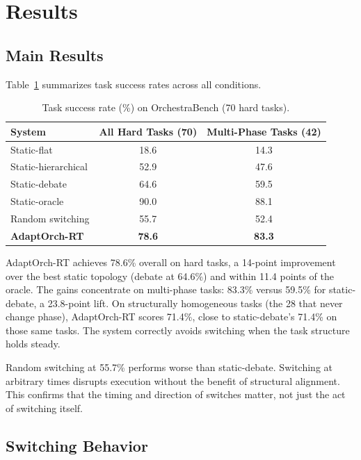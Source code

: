 \section{Results}\label{sec:results}

\subsection{Main Results}\label{main-results}

Table~\ref{tab:main_results} summarizes task success
rates across all conditions.

\begin{table}[h]
\centering
\caption{Task success rate (\%) on OrchestraBench (70 hard tasks).}
\label{tab:main_results}
\begin{tabular}{lcc}
\toprule
\textbf{System} & \textbf{All Hard Tasks (70)} & \textbf{Multi-Phase Tasks (42)} \\
\midrule
Static-flat & 18.6 & 14.3 \\
Static-hierarchical & 52.9 & 47.6 \\
Static-debate & 64.6 & 59.5 \\
Static-oracle & 90.0 & 88.1 \\
Random switching & 55.7 & 52.4 \\
\textbf{AdaptOrch-RT} & \textbf{78.6} & \textbf{83.3} \\
\bottomrule
\end{tabular}
\end{table}

AdaptOrch-RT achieves 78.6\% overall on hard tasks, a 14-point
improvement over the best static topology (debate at 64.6\%) and within
11.4 points of the oracle. The gains concentrate on multi-phase tasks:
83.3\% versus 59.5\% for static-debate, a 23.8-point lift. On
structurally homogeneous tasks (the 28 that never change phase),
AdaptOrch-RT scores 71.4\%, close to static-debate's 71.4\% on those
same tasks. The system correctly avoids switching when the task
structure holds steady.

Random switching at 55.7\% performs worse than static-debate. Switching
at arbitrary times disrupts execution without the benefit of structural
alignment. This confirms that the timing and direction of switches
matter, not just the act of switching itself.

\subsection{Switching Behavior}\label{switching-behavior}


